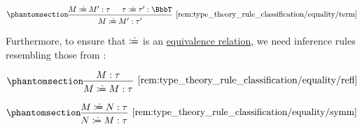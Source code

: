 \begin{remark}
\begin{thmenum}
\begin{paracol}{2}
      \begin{rightcolumn}
        \ParacolAlignmentHack
        \begin{equation*}\taglabel[\ensuremath{ \coloneqq_{\logic{term}} }]{rem:type_theory_rule_classification/equality/term}
          \begin{prooftree}
            \hypo{ M \syndefeq M': \tau }
            \hypo{ \tau \syndefeq \tau': \BbbT }
            \infer2[\ref{rem:type_theory_rule_classification/equality/term}]{ M \syndefeq M': \tau' }
          \end{prooftree}
        \end{equation*}
      \end{rightcolumn}
    \end{paracol}

    Furthermore, to ensure that \( {\syndefeq} \) is an \hyperref[def:equivalence_relation]{equivalence relation}, we need inference rules resembling those from :
    \begin{paracol}{3}
      \begin{nthcolumn}{0}
        \ParacolAlignmentHack
        \begin{equation*}\taglabel[\ensuremath{ \coloneqq_{\logic{refl}} }]{rem:type_theory_rule_classification/equality/refl}
          \begin{prooftree}
            \hypo{ M: \tau }
            \infer1[\ref{rem:type_theory_rule_classification/equality/refl}]{ M \syndefeq M: \tau }
          \end{prooftree}
        \end{equation*}
      \end{nthcolumn}

      \begin{nthcolumn}{1}
        \ParacolAlignmentHack
        \begin{equation*}\taglabel[\ensuremath{ \coloneqq_{\logic{symm}} }]{rem:type_theory_rule_classification/equality/symm}
          \begin{prooftree}
            \hypo{ M \syndefeq N: \tau }
            \infer1[\ref{rem:type_theory_rule_classification/equality/symm}]{ N \syndefeq M: \tau }
          \end{prooftree}
        \end{equation*}
      \end{nthcolumn}


\end{paracol}
\end{thmenum}
\end{remark}
